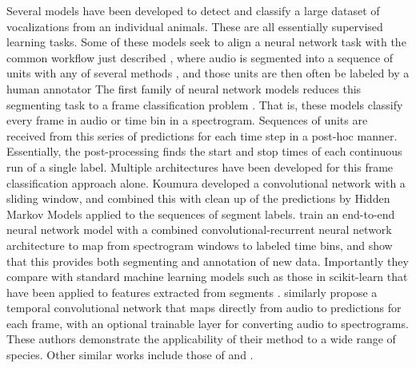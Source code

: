 Several models have been developed to detect and classify a large dataset of vocalizations from an individual animals. These are all essentially supervised learning tasks. Some of these models seek to align a neural network task with the common workflow just described \cite{kershenbaumAcousticSequencesNonhuman2016}, where audio is segmented into a sequence of units with any of several methods \cite{fukuzawaComputationalMethodsGeneralised2022}, and those units are then often be labeled by a human annotator The first family of neural network models reduces this segmenting task to a frame classification problem \cite{graves_framewise_2005, graves_supervised_2012}. That is, these models classify every frame in audio or time bin in a spectrogram. Sequences of units are received from this series of predictions for each time step in a post-hoc manner. Essentially, the post-processing finds the start and stop times of each continuous run of a single label. Multiple architectures have been developed for this frame classification approach alone. Koumura \citet{koumura_automatic_2016-1} developed a convolutional network with a sliding window, and combined this with clean up of the predictions by Hidden Markov Models applied to the sequences of segment labels.  \citet{cohenAutomatedAnnotationBirdsong2022} train an end-to-end neural network model with a combined convolutional-recurrent neural network architecture to map from spectrogram windows to labeled time bins, and show that this provides both segmenting and annotation of new data. Importantly they compare with standard machine learning models such as those in scikit-learn that have been applied to features extracted from segments \cite{nicholson2016comparison, tachibana2014semi}. \citet{steinfathFastAccurateAnnotation} similarly propose a temporal convolutional network that maps directly from audio to predictions for each frame, with an optional trainable layer for converting audio to spectrograms. These authors demonstrate the applicability of their method to a wide range of species. Other similar works include those of \cite{trouvainCanarySongDecoder2021} and \cite{renteriaBirdsongPhraseVerification2021}.
